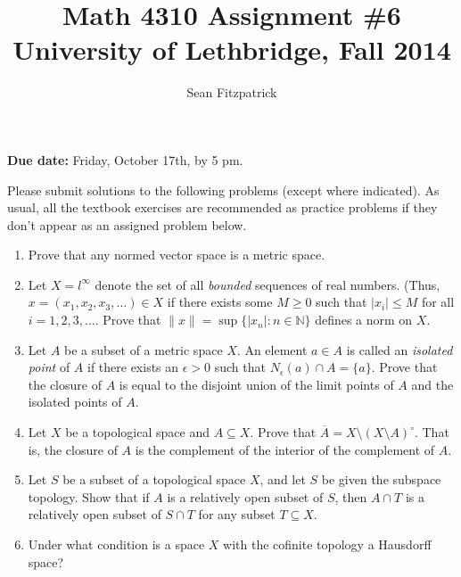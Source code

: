 \documentclass[letterpaper,12pt]{article}
\title{Math 4310 Assignment \#6\\University of Lethbridge, Fall 2014}
\author{Sean Fitzpatrick}
\newcommand{\abs}[1]{\lvert #1\rvert}
\newcommand{\len}[1]{\lVert #1\rVert}
\newcommand{\N}{\mathbb{N}}
\begin{document}
 \maketitle

{\bf Due date:} Friday, October 17th, by 5 pm.

\bigskip

Please submit solutions to the following problems (except where indicated). As usual, all the textbook exercises are recommended as practice problems if they don't appear as an assigned problem below.

\begin{enumerate}
\item Prove that any normed vector space is a metric space.
\item Let $X={l}^\infty$ denote the set of all {\em bounded} sequences of real numbers. (Thus, $x=(x_1,x_2,x_3,\ldots)\in X$ if there exists some $M\geq 0$ such that $\abs{x_i}\leq M$ for all $i=1,2,3,\ldots$. Prove that $\len{x} = \sup\{\abs{x_n}:n\in\N\}$ defines a norm on $X$. 
\item Let $A$ be a subset of a metric space $X$. An element $a\in A$ is called an {\em isolated point} of $A$ if there exists an $\epsilon>0$ such that $N_\epsilon(a)\cap A = \{a\}$. Prove that the closure of $A$ is equal to the disjoint union of the limit points of $A$ and the isolated points of $A$.
\item Let $X$ be a topological space and $A\subseteq X$. Prove that $\overline{A} = X\setminus (X\setminus A)^\circ$. That is, the closure of $A$ is the complement of the interior of the complement of $A$.
\item Let $S$ be a subset of a topological space $X$, and let $S$ be given the subspace topology. Show that if $A$ is a relatively open subset of $S$, then $A\cap T$ is a relatively open subset of $S\cap T$ for any subset $T\subseteq X$.
\item Under what condition is a space $X$ with the cofinite topology a Hausdorff space?
\end{enumerate}
\end{document}
